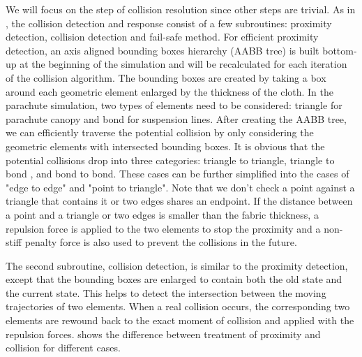 We will focus on the step of collision resolution since other steps are trivial. As in \cite{BridsonRobust2002}, the collision detection and response consist of a few subroutines: proximity detection, collision detection and fail-safe method. For efficient proximity detection, an axis aligned bounding boxes hierarchy (AABB tree) is built bottom-up at the beginning of the simulation and will be recalculated for each iteration of the collision algorithm. The bounding boxes are created by taking a box around each geometric element enlarged by the thickness of the cloth. In the parachute simulation, two types of elements need to be considered: triangle for parachute canopy and bond for suspension lines. After creating the AABB tree, we can efficiently traverse the potential collision by only considering the geometric elements with intersected bounding boxes. It is obvious that the potential collisions drop into three categories: triangle to triangle, triangle to bond , and bond to bond. These cases can be further simplified into the cases of "edge to edge" and "point to triangle". Note that we don't check a point against a triangle that contains it or two edges shares an endpoint. If the distance between a point and a triangle or two edges is smaller than the fabric thickness, a repulsion force is applied to the two elements to stop the proximity and a non-stiff penalty force is also used to prevent the collisions in the future. 

The second subroutine, collision detection, is similar to the proximity detection, except that the bounding boxes are enlarged to contain both the old state and the current state. This helps to detect the intersection between the moving trajectories of two elements. When a real collision occurs, the corresponding two elements are rewound back to the exact moment of collision and applied with the repulsion forces.  shows the difference between treatment of proximity and collision for different cases.

